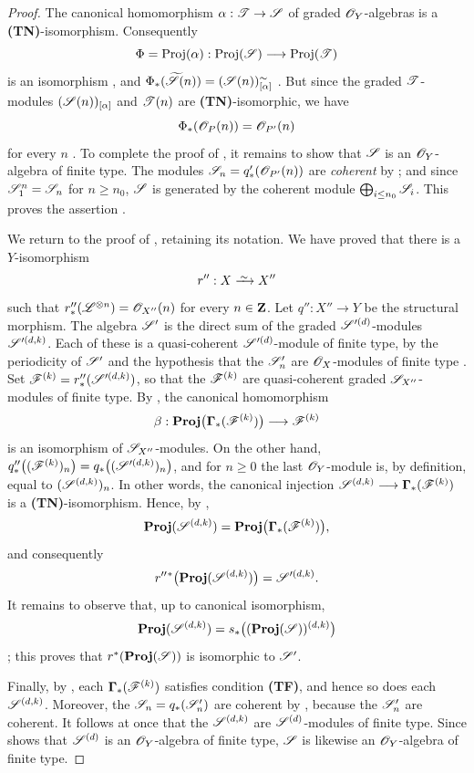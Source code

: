 \begin{proof}
The canonical homomorphism $\alpha:\mathscr{T}\to\mathscr{S}$ of graded $\mathscr{O}_Y$-algebras is a \textbf{(TN)}-isomorphism.
Consequently
\[
  \Phi=\operatorname{Proj}(\alpha):\operatorname{Proj}(\mathscr{S})\longrightarrow\operatorname{Proj}(\mathscr{T})
\]
is an isomorphism , and $\Phi_*(\widetilde{\mathscr{S}}(n))=(\mathscr{S}(n))^{\sim}_{[\alpha]}$ .
But since the graded $\mathscr{T}$-modules $(\mathscr{S}(n))_{[\alpha]}$ and $\mathscr{T}(n)$ are \textbf{(TN)}-isomorphic, we have
\[
  \Phi_*(\mathscr{O}_P(n))=\mathscr{O}_{P'}(n)
\]
for every $n$ .
To complete the proof of , it remains to show that $\mathscr{S}$ is an $\mathscr{O}_Y$-algebra of finite type.
The modules $\mathscr{S}_n=q'_*(\mathscr{O}_{P'}(n))$
are \emph{coherent} by ; and since $\mathscr{S}_1^n=\mathscr{S}_n$ for $n\geq n_0$, $\mathscr{S}$ is generated by the coherent module $\bigoplus_{i\leq n_0}\mathscr{S}_i$.
This proves the assertion .

We return to the proof of , retaining its notation.
We have proved that there is a $Y$-isomorphism
\[
  r'':X\simto X''
\]
such that $r''_*(\mathscr{L}^{\otimes n})=\mathscr{O}_{X''}(n)$
for every $n\in\mathbf{Z}$.
Let $q'':X''\to Y$ be the structural morphism.
The algebra $\mathscr{S}'$ is the direct sum of the graded $\mathscr{S}'^{(d)}$-modules $\mathscr{S}'^{(d,k)}$.
Each of these is a quasi-coherent $\mathscr{S}'^{(d)}$-module of finite type, by the periodicity of $\mathscr{S}'$ and the hypothesis that the $\mathscr{S}'_n$ are $\mathscr{O}_X$-modules of finite type .
Set $\mathscr{F}^{(k)}=r''_*(\mathscr{S}'^{(d,k)})$,
so that the $\mathscr{F}^{(k)}$ are quasi-coherent graded $\mathscr{S}_{X''}$-modules of finite type.
By , the canonical homomorphism
\[
  \beta:\operatorname{\mathbf{Proj}}\bigl(\boldsymbol{\Gamma}_*(\mathscr{F}^{(k)})\bigr)
  \longrightarrow\mathscr{F}^{(k)}
\]
is an isomorphism of $\mathscr{S}_{X''}$-modules.
On the other hand, $q''_*\bigl((\mathscr{F}^{(k)})_n\bigr)
=q_*\bigl((\mathscr{S}'^{(d,k)})_n\bigr)$,
and for $n\geq0$ the last $\mathscr{O}_Y$-module is, by definition, equal to $(\mathscr{S}^{(d,k)})_n$.
In other words, the canonical injection $\mathscr{S}^{(d,k)}
\longrightarrow\boldsymbol{\Gamma}_*(\mathscr{F}^{(k)})$
is a \textbf{(TN)}-isomorphism.
Hence, by ,
\[
  \operatorname{\mathbf{Proj}}(\mathscr{S}^{(d,k)})
  =\operatorname{\mathbf{Proj}}\bigl(\boldsymbol{\Gamma}_*(\mathscr{F}^{(k)})\bigr),
\]
and consequently
\[
  r''{}^*\bigl(\operatorname{\mathbf{Proj}}(\mathscr{S}^{(d,k)})\bigr)
  =\mathscr{S}'^{(d,k)}.
\]
It remains to observe that, up to canonical isomorphism,
\[
  \operatorname{\mathbf{Proj}}(\mathscr{S}^{(d,k)})
  =s_*\bigl((\operatorname{\mathbf{Proj}}(\mathscr{S}))^{(d,k)}\bigr)
\]
; this proves that $r^*(\operatorname{\mathbf{Proj}}(\mathscr{S}))$ is isomorphic to $\mathscr{S}'$.

Finally, by , each $\boldsymbol{\Gamma}_*(\mathscr{F}^{(k)})$ satisfies condition \textbf{(TF)}, and hence so does each $\mathscr{S}^{(d,k)}$.
Moreover, the $\mathscr{S}_n=q_*(\mathscr{S}'_n)$ are coherent by , because the $\mathscr{S}'_n$ are coherent.
It follows at once that the $\mathscr{S}^{(d,k)}$ are $\mathscr{S}^{(d)}$-modules of finite type.
Since  shows that $\mathscr{S}^{(d)}$ is an $\mathscr{O}_Y$-algebra of finite type, $\mathscr{S}$ is likewise an $\mathscr{O}_Y$-algebra of finite type.
\end{proof}

